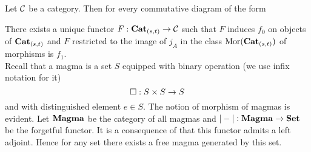 Let ${\mathcal C}$ be a category. Then for every commutative diagram of the form
\begin{center}
\end{center}
There exists a unique functor $F:\mathbf{Cat}_{(s,t)}\rightarrow {\mathcal C}$ such that $F$ induces $f_0$ on objects of $\mathbf{Cat}_{(s,t)}$ and $F$ restricted to the image of $j_A$ in the class $\mathrm{Mor}(\mathbf{Cat}_{(s,t)})$ of morphisms is $f_1$.\\
Recall that a magma is a set $S$ equipped with binary operation (we use infix notation for it)
$$\square:S\times S\rightarrow S$$
and with distinguished element $e\in S$. The notion of morphism of magmas is evident. Let $\mathbf{Magma}$ be the category of all magmas and $|-|:\mathbf{Magma}\rightarrow \mathbf{Set}$ be the forgetful functor. It is a consequence of {\cite[Corollary 3.7.8]{borceux1994handbook}} that this functor admits a left adjoint. Hence for any set there exists a free magma generated by this set.\\


